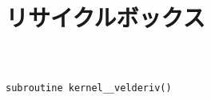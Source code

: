 \documentclass[dvipdfmx,cjk]{beamer}
\begin{document}
\section*{リサイクルボックス}




\subsection{}
\begin{frame}\frametitle{}
\begin{eqnarray}
\end{eqnarray}
\end{frame}


\begin{frame}[fragile]\frametitle{}
\begingroup \fontsize{8pt}{9pt}\selectfont
\begin{verbatim}
subroutine kernel__velderiv()
\end{verbatim}
\endgroup
\end{frame}
\end{document}
